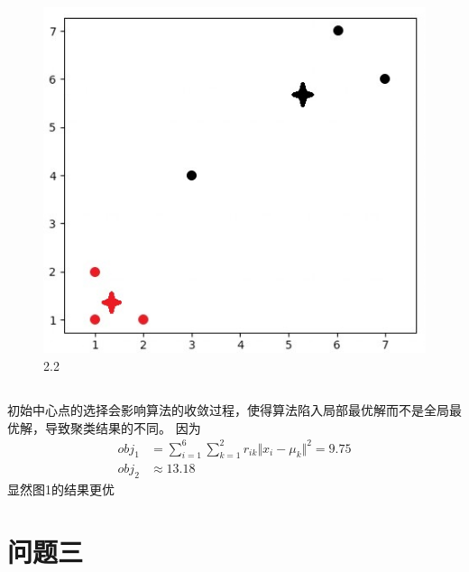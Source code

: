 \documentclass[12pt, a4paper]{article}
\begin{document}
\begin{figure}
    \centering
    \includegraphics*[scale=0.8]{img/a5_3.jpg}
    \caption{2.2}
\end{figure}

\subsection{}

初始中心点的选择会影响算法的收敛过程，使得算法陷入局部最优解而不是全局最优解，导致聚类结果的不同。
因为
\begin{align*}
    obj_1&=\sum_{i=1}^6\sum_{k=1}^2r_{ik}\Vert x_i-\mu_k \Vert^2=9.75\\
    obj_2&\approx 13.18
\end{align*}
显然图1的结果更优


\section{问题三}
\end{document}
